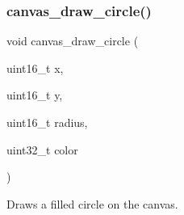 \subsubsection{\texorpdfstring{canvas\+\_\+draw\+\_\+circle()}{canvas\_draw\_circle()}}
{\footnotesize\ttfamily void canvas\+\_\+draw\+\_\+circle (\begin{DoxyParamCaption}\item[{uint16\+\_\+t}]{x,  }\item[{uint16\+\_\+t}]{y,  }\item[{uint16\+\_\+t}]{radius,  }\item[{uint32\+\_\+t}]{color }\end{DoxyParamCaption})}



Draws a filled circle on the canvas. 


